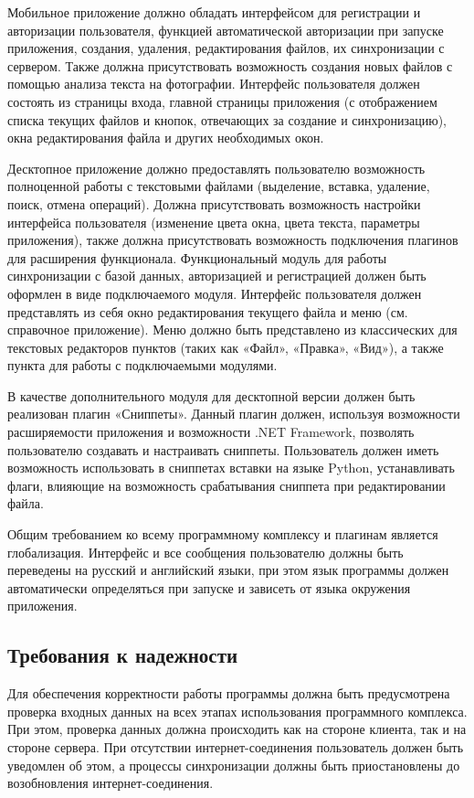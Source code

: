 Мобильное приложение должно обладать интерфейсом для регистрации и авторизации пользователя, функцией автоматической авторизации при запуске приложения, создания, удаления, редактирования файлов, их синхронизации с сервером. Также должна присутствовать возможность создания новых файлов с помощью анализа текста на фотографии. Интерфейс пользователя должен состоять из страницы входа, главной страницы приложения (с отображением списка текущих файлов и кнопок, отвечающих за создание и синхронизацию), окна редактирования файла и других необходимых окон.

Десктопное приложение должно предоставлять пользователю возможность полноценной работы с текстовыми файлами (выделение, вставка, удаление, поиск, отмена операций). Должна присутствовать возможность настройки интерфейса пользователя (изменение цвета окна, цвета текста, параметры приложения), также должна присутствовать возможность подключения плагинов для расширения функционала. Функциональный модуль для работы синхронизации с базой данных, авторизацией и регистрацией должен быть оформлен в виде подключаемого модуля. Интерфейс пользователя должен представлять из себя окно редактирования текущего файла и меню (см. справочное приложение). Меню должно быть представлено из классических для текстовых редакторов пунктов (таких как «Файл», «Правка», «Вид»), а также пункта для работы с подключаемыми модулями.

В качестве дополнительного модуля для десктопной версии должен быть реализован плагин «Сниппеты». Данный плагин должен, используя возможности расширяемости приложения и возможности .NET Framework, позволять пользователю создавать и настраивать сниппеты. Пользователь должен иметь возможность использовать в сниппетах вставки на языке Python, устанавливать флаги, влияющие на возможность срабатывания сниппета при редактировании файла.

Общим требованием ко всему программному комплексу и плагинам является глобализация. Интерфейс и все сообщения пользователю должны быть переведены на русский и английский языки, при этом язык программы должен автоматически определяться при запуске и зависеть от языка окружения приложения.

\subsection{Требования к надежности}
Для обеспечения корректности работы программы должна быть предусмотрена проверка входных данных на всех этапах использования программного комплекса. При этом, проверка данных должна происходить как на стороне клиента, так и на стороне сервера. При отсутствии интернет-соединения пользователь должен быть уведомлен об этом, а процессы синхронизации должны быть приостановлены до возобновления интернет-соединения.

